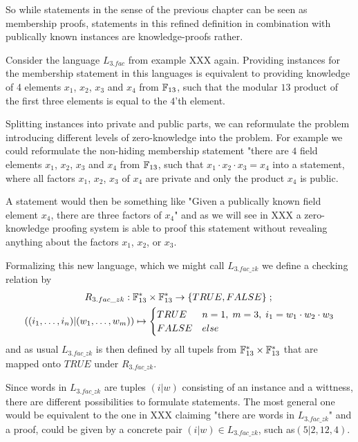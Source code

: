 So while statements in the sense of the previous chapter can be seen as membership proofs, statements in this refined definition in combination with publically known instances are knowledge-proofs rather.
\begin{example}[3-factorization]
Consider the language $L_{3.fac}$ from example XXX again. Providing instances for the membership statement in this languages is equivalent to providing knowledge of 4 elements $x_1$, $x_2$, $x_3$ and $x_4$ from $\mathbb{F}_{13}$, such that the modular $13$ product of the first three elements is equal to the $4$'th element. 

Splitting instances into private and public parts, we can reformulate the problem introducing different levels of zero-knowledge into the problem. For example we could reformulate the non-hiding membership statement "there are $4$ field elements $x_1$, $x_2$, $x_3$ and $x_4$ from $\mathbb{F}_{13}$, such that $x_1\cdot x_2\cdot x_3 = x_4$ into a statement, where all factors $x_1$, $x_2$, $x_3$ of $x_4$ are private and only the product $x_4$ is public. 

A statement would then be something like "Given a publically known field element $x_4$, there are three factors of $x_4$" and as we will see in XXX a zero-knowledge proofing system is able to proof this statement without revealing anything about the factors $x_1$, $x_2$, or $x_3$.

Formalizing this new language, which we might call $L_{3.fac\_zk}$ we define a checking relation by 
\begin{multline*}
R_{3.fac\_zk} : \mathbb{F}_{13}^* \times \mathbb{F}_{13}^* \to \{TRUE, FALSE\}\;;\;\\
((i_1,\ldots,i_n)|(w_1,\ldots, w_m)) \mapsto
\begin{cases}
TRUE & n=1,\; m=3,\; i_1 = w_1\cdot w_2 \cdot w_3\\
FALSE & else
\end{cases}
\end{multline*}
and as usual $L_{3.fac\_zk}$ is then defined by all tupels from $\mathbb{F}_{13}^* \times \mathbb{F}_{13}^*$ that are mapped onto $TRUE$ under $R_{3.fac\_zk}$. 

Since words in $L_{3.fac\_zk}$ are tuples $(i|w)$ consisting of an instance and a wittness, there are different possibilities to formulate statements. The most general one would be equivalent to the one in XXX claiming "there are words in $L_{3.fac\_zk}$" and a proof, could be given by a concrete pair $(i|w)\in L_{3.fac\_zk}$, such as$(5|2,12,4)$. 


\end{example}
